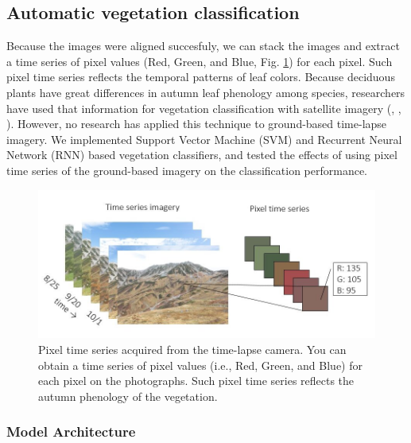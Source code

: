 \documentclass{article}
\begin{document}
\hypertarget{automatic-vegetation-classification}{%
\subsection{Automatic vegetation classification}\label{automatic-vegetation-classification}}

Because the images were aligned succesfuly, we can stack the images and extract a time series of pixel values (Red, Green, and Blue, Fig. \ref{fig:pixtimeseries}) for each pixel. Such pixel time series reflects the temporal patterns of leaf colors. Because deciduous plants have great differences in autumn leaf phenology among species, researchers have used that information for vegetation classification with satellite imagery (\cite{Tigges2013RemSenEnv}, \cite{Son2013RemSen}, \cite{Heupel2018PFG}). However, no research has applied this technique to ground-based time-lapse imagery. We implemented Support Vector Machine (SVM) and Recurrent Neural Network (RNN) based vegetation classifiers, and tested the effects of using pixel time series of the ground-based imagery on the classification performance.



\begin{figure}
\includegraphics[width=1\linewidth]{paper_files/figures/Slide1} \caption{Pixel time series acquired from the time-lapse camera. You can obtain a time series of pixel values (i.e., Red, Green, and Blue) for each pixel on the photographs. Such pixel time series reflects the autumn phenology of the vegetation.}\label{fig:pixtimeseries}
\end{figure}

\hypertarget{model-architecture}{%
\subsubsection{Model Architecture}\label{model-architecture}}
\end{document}
